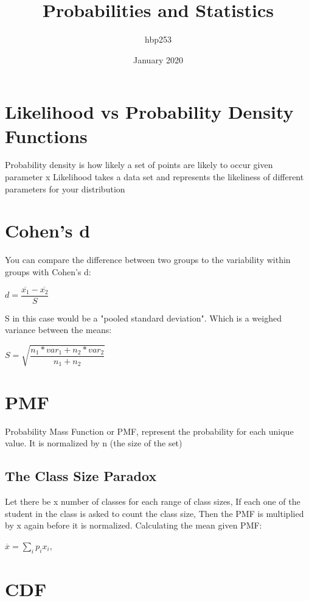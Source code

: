 \documentclass{article}
\title{Probabilities and Statistics}
\author{hbp253}
\date{January 2020}
\begin{document}
\maketitle

\section{Likelihood vs Probability Density Functions}
    Probability density is how likely a set of points are likely to occur given parameter x
    \newline
    Likelihood takes a data set and represents the likeliness of different parameters for your distribution

\section{Cohen's d}
    You can compare the difference between two groups to the variability within groups with Cohen's d:
    \newline
    \begin{center} 
    $d = \dfrac{\overline{x_1} - \overline{x_2}}{S}$
    \end{center}

    S in this case would be a "pooled standard deviation". Which is a weighed variance between the means:
    \begin{center}
    $S = \sqrt{\dfrac{n_1 * var_1 + n_2 * var_2}{n_1 + n_2}}$
    \end{center}

\section{PMF}
Probability Mass Function or PMF, represent the probability for each unique value. It is normalized by n (the size of the set)
\subsection{The Class Size Paradox}
    Let there be x number of classes for each range of class sizes,\newline
    If each one of the student in the class is asked to count the class size,\newline
    Then the PMF is multiplied by x again before it is normalized.\newline
    Calculating the mean given PMF:
    \begin{center}
    $ \overline{x} = \sum_{i}{} p_i x_i $,
    \end{center}

\section{CDF}
\end{document}

